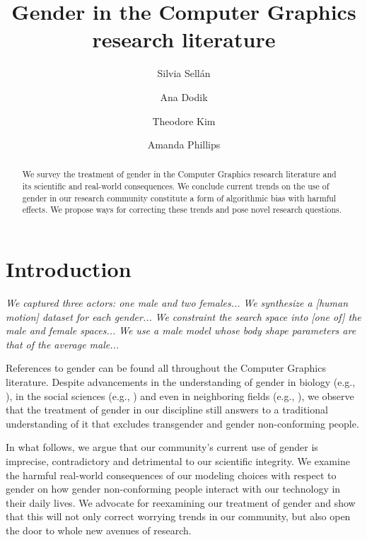 \documentclass[sigconf,review,balance=false]{acmart}
\begin{document}
\title{Gender in the Computer Graphics research literature}

\author{Silvia Sellán}

\author{Ana Dodik}

\author{Theodore Kim}

\author{Amanda Phillips}


\begin{abstract}
    We survey the treatment of gender in the Computer Graphics research
    literature and its scientific and real-world consequences. We conclude
    current trends on the use of gender in our research community constitute a
    form of algorithmic bias with harmful effects. We propose ways for
    correcting these trends and pose novel research questions.
\end{abstract}


\maketitle

\section{Introduction}

\textit{We captured three actors: one male and two females...} \textit{We
synthesize a [human motion] dataset for each gender...} \textit{We constraint
the search space into [one of] the male and female spaces...} \textit{We use a
male model whose body shape parameters are that of the average male...}

References to gender can be found all throughout the Computer Graphics
literature. Despite advancements in the understanding of gender in biology (e.g., \cite{fausto2012sex}), in the social sciences (e.g., \cite{butler2003gender}) and even in neighboring
fields (e.g., \cite{keyes2021you}), we observe that the treatment of gender in our discipline
still answers to a traditional understanding of it that excludes transgender and
gender non-conforming people.

In what follows, we argue that our community's current use of gender is
imprecise, contradictory and detrimental to our scientific integrity.
We examine the harmful real-world consequences of our modeling
choices with respect to gender on how gender non-conforming people interact with
our technology in their daily lives. We advocate for reexamining our
treatment of gender and show that this will not only correct worrying trends in
our community, but also open the door to whole new avenues of research.
\end{document}
